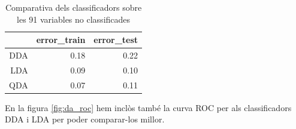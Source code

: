 \documentclass[a4paper,10pt]{article}
\begin{document}
\begin{table}[ht]
\begin{center}
\begin{tabular}{rrr}
  \hline
 & error\_train & error\_test \\ 
  \hline
DDA & 0.18 & 0.22 \\ 
  LDA & 0.09 & 0.10 \\ 
  QDA & 0.07 & 0.11 \\ 
   \hline
\end{tabular}
\caption{Comparativa dels classificadors sobre les 91 variables no classificades}
\label{tab:error_da1}
\end{center}
\end{table}
En la figura \ref{fig:da_roc} hem inclòs també la curva ROC per als classificadors DDA i LDA per poder comparar-los millor. 
\\
\\
\end{document}
